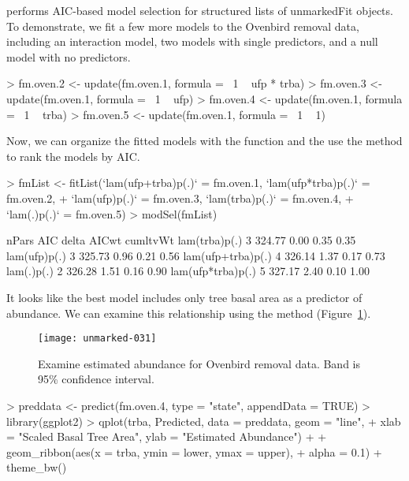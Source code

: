 \documentclass[article,shortnames]{jss}
\begin{document}
 performs AIC-based model selection for structured lists of 
unmarkedFit objects.  To demonstrate, we fit a few more models to the Ovenbird
removal data, including an interaction model, two models with
single predictors, and a null model with no predictors.

\begin{Schunk}
\begin{Sinput}
> fm.oven.2 <- update(fm.oven.1, formula = ~1 ~ ufp * trba)
> fm.oven.3 <- update(fm.oven.1, formula = ~1 ~ ufp)
> fm.oven.4 <- update(fm.oven.1, formula = ~1 ~ trba)
> fm.oven.5 <- update(fm.oven.1, formula = ~1 ~ 1)
\end{Sinput}
\end{Schunk}

Now, we can organize the fitted models with the  function and
the use the  method to rank the models by AIC.

\begin{Schunk}
\begin{Sinput}
> fmList <- fitList(`lam(ufp+trba)p(.)` = fm.oven.1, `lam(ufp*trba)p(.)` = fm.oven.2, 
+     `lam(ufp)p(.)` = fm.oven.3, `lam(trba)p(.)` = fm.oven.4, 
+     `lam(.)p(.)` = fm.oven.5)
> modSel(fmList)
\end{Sinput}
\begin{Soutput}
                  nPars    AIC delta AICwt cumltvWt
lam(trba)p(.)         3 324.77  0.00  0.35     0.35
lam(ufp)p(.)          3 325.73  0.96  0.21     0.56
lam(ufp+trba)p(.)     4 326.14  1.37  0.17     0.73
lam(.)p(.)            2 326.28  1.51  0.16     0.90
lam(ufp*trba)p(.)     5 327.17  2.40  0.10     1.00
\end{Soutput}
\end{Schunk}

It looks like the best model includes only tree basal area as a
predictor of abundance.  We can examine this relationship using
the  method (Figure~\ref{fig:pred}).


\begin{figure}[ht]
  \centering
\texttt{[image: unmarked-031]}
\caption{Examine estimated abundance for Ovenbird removal data.  Band
  is 95\% confidence interval.}
\label{fig:pred}
\end{figure}

\begin{Schunk}
\begin{Sinput}
> preddata <- predict(fm.oven.4, type = "state", appendData = TRUE)
> library(ggplot2)
> qplot(trba, Predicted, data = preddata, geom = "line", 
+     xlab = "Scaled Basal Tree Area", ylab = "Estimated Abundance") + 
+     geom_ribbon(aes(x = trba, ymin = lower, ymax = upper), 
+         alpha = 0.1) + theme_bw()
\end{Sinput}
\end{Schunk}
\end{document}
